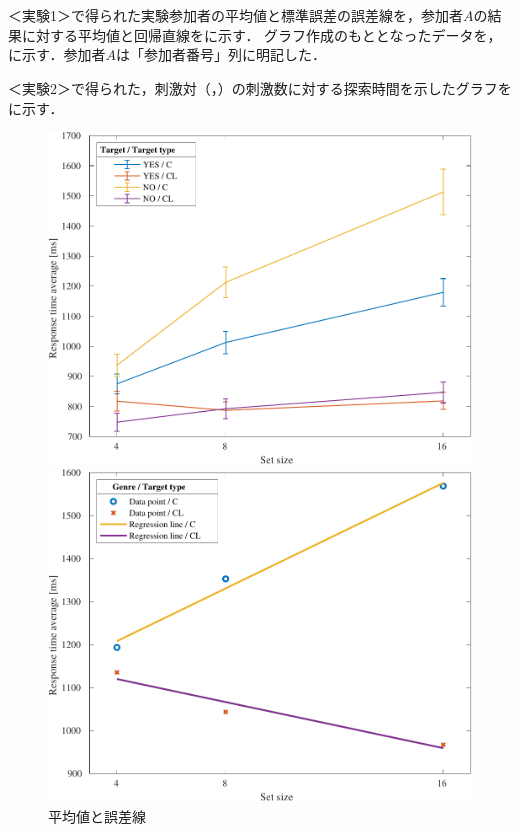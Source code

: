 \section{\result}
＜実験1＞で得られた実験参加者の平均値と標準誤差の誤差線を，参加者\(A\)の結果に対する平均値と回帰直線をに示す．
グラフ作成のもととなったデータを，に示す．参加者\(A\)は「参加者番号」列に明記した．\par
＜実験2＞で得られた，刺激対（，）の刺激数に対する探索時間を示したグラフをに示す．
\begin{figure}[H]
    \centering
    \begin{minipage}[b]{.49\textwidth}
        \centering
        \includegraphics[keepaspectratio,width=\textwidth]{../../Figures/14_01_graph.pdf}
        \caption{平均値と誤差線}
        \label{fig:平均値と誤差線}
    \end{minipage}
    \begin{minipage}[b]{.49\textwidth}
        \centering
        \includegraphics[keepaspectratio,width=\textwidth]{../../Figures/14_02_graph.pdf}

\end{minipage}
\end{figure}
